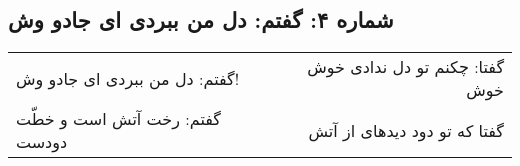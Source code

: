 \begin{center}
\section*{شماره ۴: گفتم: دل من ببردی ای جادو وش}
\label{sec:004}
\begin{longtable}{l p{0.5cm} r}
گفتم: دل من ببردی ای جادو وش!
&&
گفتا: چکنم تو دل ندادی خوش خوش
\\
گفتم: رخت آتش است و خطّت دودست
&&
گفتا که تو دود دیدهای از آتش
\\
\end{longtable}
\end{center}

